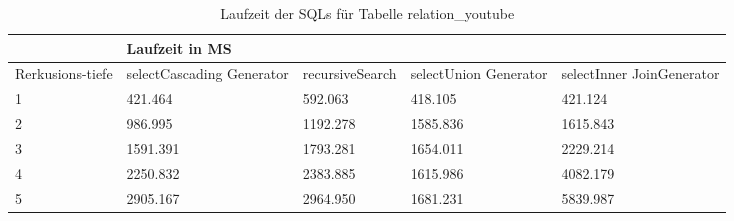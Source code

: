 \begin{table}[H]
	\begin{tabular}{l|l|l|l|l|l|}
		\cline{2-6}
		& \multicolumn{5}{|l|}{Laufzeit in MS}                                                                                                                                                  \\ \hline
		\multicolumn{1}{|l|}{\multirow{2}{2cm}{Rerkusions-tiefe}} & \multicolumn{2}{|l|}{\multirow{2}{3cm}{selectCascading Generator}} & \multirow{2}{2.8cm}{recursiveSearch} & \multirow{2}{2.5cm}{selectUnion Generator} & \multirow{2}{2.5cm}{selectInner JoinGenerator} \\
		\multicolumn{1}{|l|}{}
		& \multicolumn{2}{|l|}{}                                           &                                  &                                     &                                           \\ \hline
		
		\multicolumn{1}{|l|}{1}                                 & \multicolumn{2}{l|}{421.464}                                     & 592.063                                               & 418.105                                                   & 421.124                                                         \\ \hline
		\multicolumn{1}{|l|}{2}                                 & \multicolumn{2}{l|}{986.995}                                     & 1192.278                                              & 1585.836                                                  & 1615.843                                                        \\ \hline
		\multicolumn{1}{|l|}{3}                                 & \multicolumn{2}{l|}{1591.391}                                    & 1793.281                                              & 1654.011                                                  & 2229.214                                                        \\ \hline
		\multicolumn{1}{|l|}{4}                                 & \multicolumn{2}{l|}{2250.832}                                    & 2383.885                                              & 1615.986                                                  & 4082.179                                                        \\ \hline
		\multicolumn{1}{|l|}{5}                                 & \multicolumn{2}{l|}{2905.167}                                    & 2964.950                                              & 1681.231                                                  & 5839.987                                                        \\ \hline
		
		
		
	\end{tabular}
	\caption{Laufzeit der SQLs für Tabelle relation\_youtube}
\end{table}


